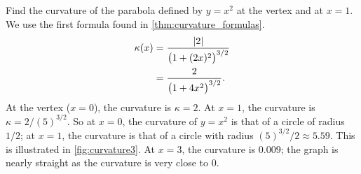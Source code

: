 
\begin{example}\label{ex_curvature3}%
Find the curvature of the parabola defined by $y=x^2$ at the vertex and at $x=1$.
\solution
We use the first formula found in \autoref{thm:curvature_formulas}. 
\begin{align*}
\kappa(x) &= \frac{\left\lvert 2 \right\rvert}{\bigl(1+(2x)^2\bigr)^{3/2}} \\
			&= \frac2{\bigl(1+4x^2\bigr)^{3/2}}.
\end{align*}
At the vertex ($x=0$), the curvature is $\kappa = 2$. At $x=1$, the curvature is $\kappa = 2/(5)^{3/2}$. So at $x=0$, the curvature of $y=x^2$ is that of a circle of radius $1/2$; at $x=1$, the curvature is that of a circle with radius $(5)^{3/2}/2\approx 5.59$. This is illustrated in \autoref{fig:curvature3}. At $x=3$, the curvature is $0.009$; the graph is nearly straight as the curvature is very close to 0.
\end{example}

